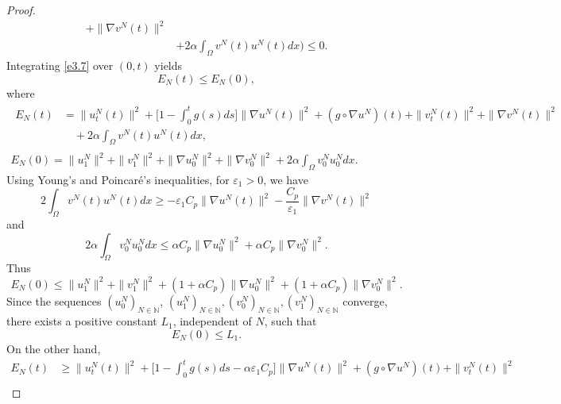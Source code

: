\documentclass[reqno]{amsart}
\begin{document}
\begin{proof}
\begin{equation}
\begin{aligned}
 + \| \nabla v^N (t)\|^2 \\
&+ 2 \alpha \int_{\Omega} v^N(t) u^N(t) dx\Big)\leq 0.
\end{aligned} \label{e3.7}
\end{equation}
Integrating \eqref{e3.7} over $(0, t)$ yields
\begin{equation}
 E_N(t)\leq E_N(0), \label{e3.8}
\end{equation}
where
 \begin{gather*}
 \begin{aligned}
E_N(t)&=\| u^N_{t} (t) \|^2 + \Big[ 1-\int_0^t g(s)ds\Big] \| \nabla u^N(t) \|^2 +(g\circ\nabla u^N)(t)
 +\| v^N_{t}(t) \|^2 + \| \nabla v^N(t) \|^2\\
&\quad + 2 \alpha \int_{\Omega} v^N(t) u^N(t) dx,
\end{aligned}\\
E_N(0)= \| u^N_{1} \|^2 + \| v^N_{1} \|^2 +\| \nabla u^N_0 \|^2
 +\| \nabla v^N_0 \|^2+ 2 \alpha \int_{\Omega} v^N_0 u^N_0 dx.
\end{gather*}
Using Young's and Poincar\'e's inequalities, for $\varepsilon_{1}> 0$, we have
 \begin{equation}
 2\int_{\Omega} v^N(t) u^N(t) dx\geq - \varepsilon_{1} C_p\| \nabla u^N (t) \|^2 - \frac{C_p}{\varepsilon_{1}} \| \nabla v^N (t) \|^2
 \label{e3.9}
 \end{equation}
and
 \begin{equation}
 2 \alpha \int_{\Omega} v^N_0 u^N_0 dx\leq \alpha C_p\| \nabla u^N_0 \|^2 + \alpha C_p \| \nabla v^N_0 \|^2.
 \label{e3.10}
 \end{equation}
Thus
\begin{equation}
 E_N(0)\leq \| u^N_{1} \|^2 + \| v^N_{1} \|^2 +(1+\alpha C_p)\| \nabla u^N_0 \|^2 +(1+\alpha C_p)\| \nabla v^N_0 \|^2.\label{e3.11}
 \end{equation}
Since the sequences $ (u_0^N)_{N \in \mathbb{N}}$,
$ (u_1^N)_{N \in \mathbb{N}}, (v_0^N)_{N \in \mathbb{N}}, (v_1^N)_{N \in \mathbb{N}} $ converge, there exists a positive constant $L_{1}$, independent of $N$, such that
\begin{equation}
E_N(0)\leq L_{1}.\label{e3.12}
\end{equation}
On the other hand,
\begin{equation}
\begin{aligned}
E_N(t)
&\geq \| u^N_{t}(t) \|^2 + \Big[ 1-\int_0^t g(s)ds -\alpha \varepsilon_{1} C_p \Big]
 \| \nabla u^N(t) \|^2 +(g\circ\nabla u^N)(t)+\| v^N_{t} (t) \|^2 \\

\end{aligned}
\end{equation}
\end{proof}
\end{document}
